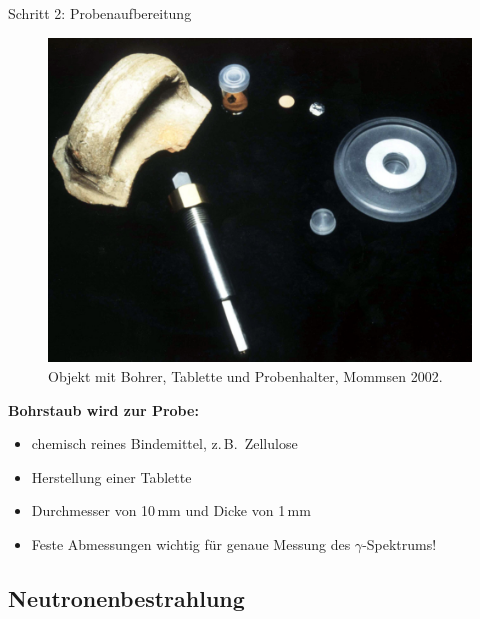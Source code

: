 \documentclass[xcolor=x11names, aspectratio=169]{beamer}
\begin{document}
\begin{frame}{Schritt 2: Probenaufbereitung}
\begin{minipage}{0.5\textwidth}
\begin{figure}
\includegraphics[width=\textwidth]{img/pill.jpg}
\caption{Objekt mit Bohrer, Tablette und Probenhalter, Mommsen 2002.}
\end{figure}
\end{minipage}\hfill
\begin{minipage}{.44\textwidth}\flushleft
\textbf{Bohrstaub wird zur Probe:}\smallskip

\begin{itemize}
\item chemisch reines Bindemittel, z.\,B.\ Zellulose
\item Herstellung einer \alert{Tablette}
\item Durchmesser von 10\,mm und Dicke von 1\,mm
\item Feste Abmessungen wichtig für genaue Messung des $\gamma$-Spektrums!
\end{itemize}
\end{minipage}
\end{frame}

\subsection{Neutronenbestrahlung}
\end{document}
